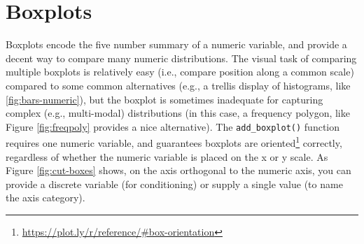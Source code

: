 \documentclass[
  12pt,
]{krantz}
\newenvironment{Shaded}{\begin{snugshade}}{\end{snugshade}}
\newcommand{\DataTypeTok}[1]{\textcolor[rgb]{0.13,0.29,0.53}{#1}}
\newcommand{\DecValTok}[1]{\textcolor[rgb]{0.00,0.00,0.81}{#1}}
\newcommand{\FloatTok}[1]{\textcolor[rgb]{0.00,0.00,0.81}{#1}}
\newcommand{\KeywordTok}[1]{\textcolor[rgb]{0.13,0.29,0.53}{\textbf{#1}}}
\newcommand{\NormalTok}[1]{#1}
\newcommand{\OperatorTok}[1]{\textcolor[rgb]{0.81,0.36,0.00}{\textbf{#1}}}
\newcommand{\OtherTok}[1]{\textcolor[rgb]{0.56,0.35,0.01}{#1}}
\newcommand{\StringTok}[1]{\textcolor[rgb]{0.31,0.60,0.02}{#1}}
\renewcommand{\href}[2]{#2\footnote{\url{#1}}}
\begin{document}
\hypertarget{boxplots}{%
\chapter{Boxplots}\label{boxplots}}

Boxplots encode the five number summary of a numeric variable, and provide a decent way to compare many numeric distributions. The visual task of comparing multiple boxplots is relatively easy (i.e., compare position along a common scale) compared to some common alternatives (e.g., a trellis display of histograms, like \ref{fig:bars-numeric}), but the boxplot is sometimes inadequate for capturing complex (e.g., multi-modal) distributions (in this case, a frequency polygon, like Figure \ref{fig:freqpoly} provides a nice alternative). The \texttt{add\_boxplot()} function requires one numeric variable, and guarantees boxplots are \href{https://plot.ly/r/reference/\#box-orientation}{oriented} correctly, regardless of whether the numeric variable is placed on the x or y scale. As Figure \ref{fig:cut-boxes} shows, on the axis orthogonal to the numeric axis, you can provide a discrete variable (for conditioning) or supply a single value (to name the axis category).

\begin{Shaded}
\end{Shaded}
\end{document}
